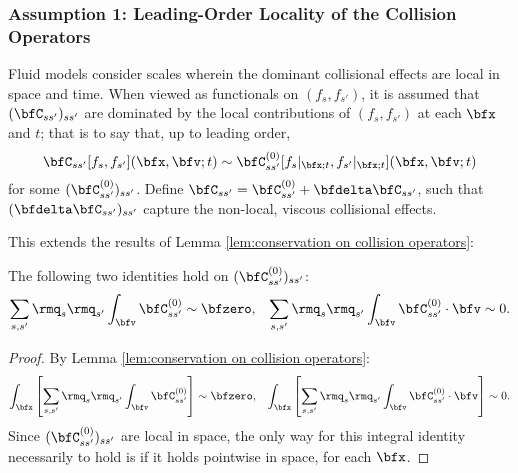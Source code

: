 \subsubsection*{Assumption 1: Leading-Order Locality of the Collision Operators}
    Fluid models consider scales wherein the dominant collisional effects are local in space and time.  When viewed as functionals on $(f_{s}, f_{s'})$, it is assumed that $(\bfC_{ss'})_{ss'}$ are dominated by the local contributions of $(f_{s}, f_{s'})$ at each $\bfx$ and $t$;  that is to say that, up to leading order,
    \begin{equation}\label{eqn:local collision operator}
        \bfC_{ss'}[f_{s}, f_{s'}](\bfx, \bfv; t)  \sim  \bfC_{ss'}^{(0)}[f_{s}|_{\bfx; t}, f_{s'}|_{\bfx; t}](\bfx, \bfv; t)
    \end{equation}
    for some $(\bfC_{ss'}^{(0)})_{ss'}$. Define $\bfC_{ss'}  = 
     \bfC_{ss'}^{(0)} + \bfdelta\bfC_{ss'}$, such that $(\bfdelta\bfC_{ss'})_{ss'}$ capture the non-local, viscous collisional effects.
    
    This extends the results of Lemma \ref{lem:conservation on collision operators}:

    \begin{lemma}\label{lem:conservation on local collision operators}
        The following two identities hold on $(\bfC_{ss'}^{(0)})_{ss'}$:
        \begin{align}
            \sum_{s, s'}\rmq_{s}\rmq_{s'}\int_{\bfv}\bfC_{ss'}^{(0)}           \sim  \bfzero,  &&
            \sum_{s, s'}\rmq_{s}\rmq_{s'}\int_{\bfv}\bfC_{ss'}^{(0)}\cdot\bfv  \sim  0.
        \end{align}
    \end{lemma}
    \begin{proof}
        By Lemma \ref{lem:conservation on collision operators}:
        \begin{align}
            \int_{\bfx}\left[\sum_{s, s'}\rmq_{s}\rmq_{s'}\int_{\bfv}\bfC_{ss'}^{(0)}\right]           \sim  \bfzero,  &&
            \int_{\bfx}\left[\sum_{s, s'}\rmq_{s}\rmq_{s'}\int_{\bfv}\bfC_{ss'}^{(0)}\cdot\bfv\right]  \sim  0.
        \end{align}
        Since $(\bfC_{ss'}^{(0)})_{ss'}$ are local in space, the only way for this integral identity necessarily to hold is if it holds pointwise in space, for each $\bfx$.
    \end{proof}

